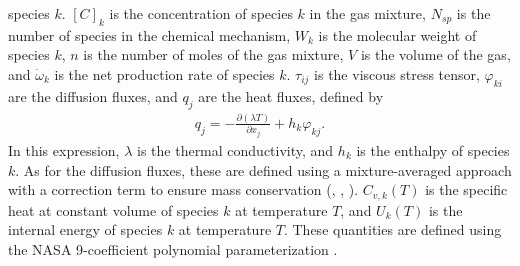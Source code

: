 species $k$. $[C]_{k}$ is the concentration of species $k$ in the gas mixture, $N_{sp}$ is the number of species
in the chemical mechanism, $W_{k}$ is the molecular weight of species $k$, $n$ is the number of moles of the gas
mixture, $V$ is the volume of the gas, and $\dot{\omega}_{k}$ is the net production rate of species $k$. $\tau_{ij}$
is the viscous stress tensor, $\varphi_{ki}$ are the diffusion fluxes, and $q_{j}$ are the heat fluxes, defined by
\begin{align}
q_{j} = - \frac{\partial (\lambda T)}{\partial x_{j}} + h_{k}\varphi_{kj}.
\end{align}
In this expression, $\lambda$ is the thermal conductivity, and $h_{k}$ is the enthalpy of species $k$.
As for the diffusion fluxes, these are defined using a mixture-averaged approach with a
correction term to ensure mass conservation (\cite{smooke2013computation}, \cite{poinsot2005theoretical}, \cite{kee2005chemically}).
$C_{v,k}(T)$ is the specific heat at constant volume of species $k$ at temperature $T$, and $U_{k}(T)$ is
the internal energy of species $k$ at temperature $T$. These quantities are defined using the NASA 9-coefficient
polynomial parameterization \cite{mcbride2002nasa}.


